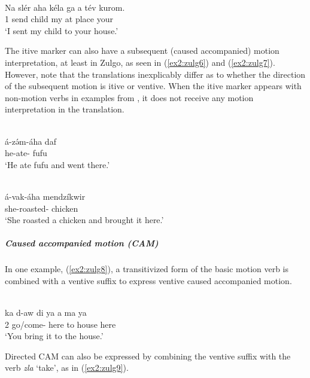 \ex\label{ex2:zulg5}
 \\
\gll Na slér aha kéla ga a tév kurom. \\
1 send  child my at place your	\\
\glt `I sent my child to your house.'
\z 

The itive marker can also have a subsequent (caused accompanied) motion interpretation, at least in Zulgo, as seen in (\ref{ex2:zulg6}) and (\ref{ex2:zulg7}). However, note that the translations inexplicably differ as to whether the direction of the subsequent motion is itive or ventive. When the itive marker appears with non-motion verbs in examples from \citet{scherrerOverviewGemzekNarrative2012}, it does not receive any motion interpretation in the translation. 

\ea\label{ex2:zulg6}
 \\
\gll á-zə́m-áha daf \\
he-ate- fufu \\
\glt `He ate fufu and went there.'

\ex\label{ex2:zulg7}
 \\
\gll á-vak-áha mendzíkwir \\
she-roasted- chicken \\
\glt `She roasted a chicken and brought it here.'
\z 

\subparagraph{Caused accompanied motion (CAM)}

In one example, (\ref{ex2:zulg8}), a transitivized form of the basic motion verb is combined with a ventive suffix to express ventive caused accompanied motion. 

\ea\label{ex2:zulg8}
 \\
\gll ka d-aw di ya a ma ya \\
2 go/come-  here to house here \\
\glt `You bring it to the house.'
\z 

Directed CAM can also be expressed by combining the ventive suffix with the verb \textit{zla} `take', as in (\ref{ex2:zulg9}).

